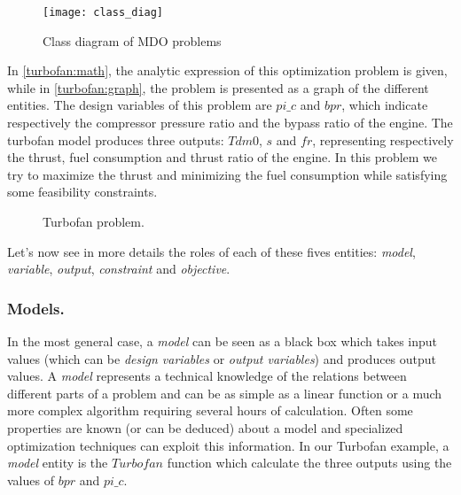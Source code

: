 \begin{figure}[t]
	\centering
	\texttt{[image: class\_diag]}
	\caption{Class diagram of MDO problems}
	\label{class_diag}
\end{figure}

In \figurename{} \ref{turbofan:math}, the analytic expression of this optimization problem is given, while in \figurename{} \ref{turbofan:graph}, the problem is presented as a graph of the different entities. The design variables of this problem are $pi\_c$ and $bpr$, which indicate respectively the compressor pressure ratio and the bypass ratio of the engine. The turbofan model produces three outputs: $Tdm0$, $s$ and $fr$, representing respectively the thrust, fuel consumption and thrust ratio of the engine. In this problem we try to maximize the thrust and minimizing the fuel consumption while satisfying some feasibility constraints. 

\begin{figure}[]
\centering
{}\hfill%

\caption{Turbofan problem.}
\label{turbofan}

\end{figure}

Let's now see in more details the roles of each of these fives entities: \emph{model}, \emph{variable}, \emph{output}, \emph{constraint} and \emph{objective}.

\subsubsection*{Models.}

In the most general case, a \emph{model} can be seen as a black box which takes input values (which can be \emph{design variables} or \emph{output variables}) and produces output values. A \emph{model} represents a technical knowledge of the relations between different parts of a problem and can be as simple as a linear function or a much more complex algorithm requiring several hours of calculation. Often some properties are known (or can be deduced) about a model and specialized optimization techniques can exploit this information.
In our Turbofan example, a \emph{model} entity is the $Turbofan$ function which calculate the three outputs using the values of $bpr$ and $pi\_c$.

